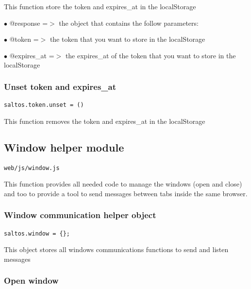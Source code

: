 \documentclass[a4paper]{article}
\begin{document}
This function store the token and expires\_at in the localStorage

\begin{compactitem}
\item[\color{myblue}$\bullet$] @response   =$>$ the object that contains the follow parameters:
\item[\color{myblue}$\bullet$] @token      =$>$ the token that you want to store in the localStorage
\item[\color{myblue}$\bullet$] @expires\_at =$>$ the expires\_at of the token that you want to store in the localStorage
\end{compactitem}

\hypertarget{toc304}{}
\subsubsection{Unset token and expires\_at}

\begin{lstlisting}
saltos.token.unset = ()
\end{lstlisting}

This function removes the token and expires\_at in the localStorage

\hypertarget{toc305}{}
\subsection{Window helper module}

\begin{lstlisting}
web/js/window.js
\end{lstlisting}

This function provides all needed code to manage the windows (open and close) and too
to provide a tool to send messages between tabs inside the same browser.

\hypertarget{toc306}{}
\subsubsection{Window communication helper object}

\begin{lstlisting}
saltos.window = {};
\end{lstlisting}

This object stores all windows communications functions to send and listen messages

\hypertarget{toc307}{}
\subsubsection{Open window}
\end{document}
